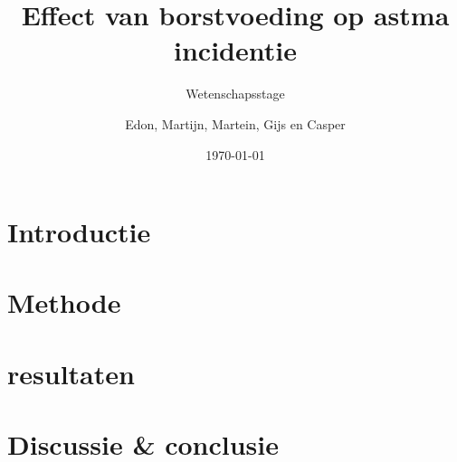 \documentclass[abstract=true]{scrartcl}
\title{Effect van borstvoeding op astma incidentie}
\subtitle{Wetenschapsstage}
\author{Edon, Martijn, Martein, Gijs en Casper}
\date{\today}
\begin{document}
\maketitle
    \begin{abstract}

    \end{abstract}

\section{Introductie}

\section{Methode}

\section{resultaten}

\section{Discussie \& conclusie}

\printbibliography
\end{document}
